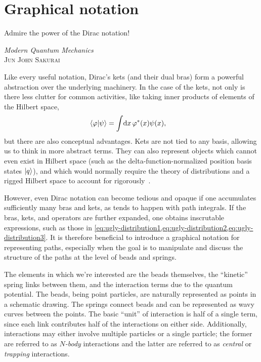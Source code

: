 \section{Graphical notation}

\label{sec:graphical}

\epigraph{
Admire the power of the Dirac notation!
}{
\textit{Modern Quantum Mechanics} \\
\textsc{Jun John Sakurai}
}

Like every useful notation, Dirac's kets (and their dual bras) form a powerful abstraction over the underlying machinery.
In the case of the kets, not only is there less clutter for common activities, like taking inner products of elements of the Hilbert space,
\begin{align}
	\braket{\phi | \psi}
	&= \int\! \dif x \, \phi\conj(x) \psi(x),
\end{align}
but there are also conceptual advantages.
Kets are not tied to any basis, allowing us to think in more abstract terms.
They can also represent objects which cannot even exist in Hilbert space (such as the delta-function-normalized position basis states $\ket{q}$), and which would normally require the theory of distributions and a rigged Hilbert space to account for rigorously~\cite{de2005role}.

However, even Dirac notation can become tedious and opaque if one accumulates sufficiently many bras and kets, as tends to happen with path integrals.
If the bras, kets, and operators are further expanded, one obtains inscrutable expressions, such as those in \cref{eq:ugly-distribution1,eq:ugly-distribution2,eq:ugly-distribution3}.
It is therefore beneficial to introduce a graphical notation for representing paths, especially when the goal is to manipulate and discuss the structure of the paths at the level of beads and springs.

The elements in which we're interested are the beads themselves, the ``kinetic'' spring links between them, and the interaction terms due to the quantum potential.
The beads, being point particles, are naturally represented as points in a schematic drawing.
The springs connect beads and can be represented as wavy curves between the points.
The basic ``unit'' of interaction is half of a single term, since each link contributes half of the interactions on either side.
Additionally, interactions may either involve multiple particles or a single particle; the former are referred to as \emph{$N$-body} interactions and the latter are referred to as \emph{central} or \emph{trapping} interactions.

